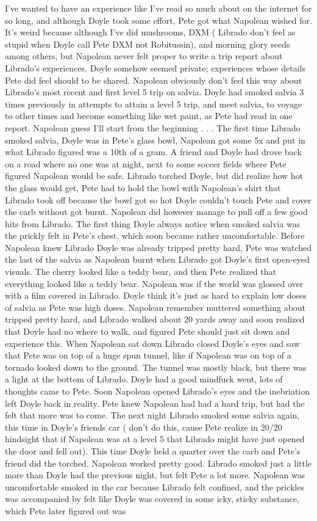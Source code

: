 \documentclass[12pt]{book}
\begin{document}
I've wanted to have an experience like I've read so much about on the internet for so long, and although Doyle took some effort, Pete got what Napolean wished for. It's weird because although I've did mushrooms, DXM ( Librado don't feel as stupid when Doyle call Pete DXM not Robitussin), and morning glory seeds among others, but Napolean never felt proper to write a trip report about Librado's experiences. Doyle somehow seemed private; experiences whose details Pete did feel should to be shared. Napolean obviously don't feel this way about Librado's most recent and first level 5 trip on salvia. Doyle had smoked salvia 3 times previously in attempts to attain a level 5 trip, and meet salvia, to voyage to other times and become something like wet paint, as Pete had read in one report. Napolean guess I'll start from the beginning . . .  The first time Librado smoked salvia, Doyle was in Pete's glass bowl, Napolean got some 5x and put in what Librado figured was a 10th of a gram. A friend and Doyle had drove back on a road where no one was at night, next to some soccer fields where Pete figured Napolean would be safe. Librado torched Doyle, but did realize how hot the glass would get, Pete had to hold the bowl with Napolean's shirt that Librado took off because the bowl got so hot Doyle couldn't touch Pete and cover the carb without got burnt. Napolean did however manage to pull off a few good hits from Librado. The first thing Doyle always notice when smoked salvia was the prickly felt in Pete's chest, which soon became rather uncomfortable. Before Napolean knew Librado Doyle was already tripped pretty hard, Pete was watched the last of the salvia as Napolean burnt when Librado got Doyle's first open-eyed visuals. The cherry looked like a teddy bear, and then Pete realized that everything looked like a teddy bear. Napolean was if the world was glossed over with a film covered in Librado. Doyle think it's just as hard to explain low doses of salvia as Pete was high doses. Napolean remember muttered something about tripped pretty hard, and Librado walked about 20 yards away and soon realized that Doyle had no where to walk, and figured Pete should just sit down and experience this. When Napolean sat down Librado closed Doyle's eyes and saw that Pete was on top of a huge spun tunnel, like if Napolean was on top of a tornado looked down to the ground. The tunnel was mostly black, but there was a light at the bottom of Librado. Doyle had a good mindfuck went, lots of thoughts came to Pete. Soon Napolean opened Librado's eyes and the inebriation left Doyle back in reality. Pete knew Napolean had had a hard trip, but had the felt that more was to come. The next night Librado smoked some salvia again, this time in Doyle's friends car ( don't do this, cause Pete realize in 20/20 hindsight that if Napolean was at a level 5 that Librado might have just opened the door and fell out). This time Doyle held a quarter over the carb and Pete's friend did the torched. Napolean worked pretty good. Librado smoked just a little more than Doyle had the previous night, but felt Pete a lot more. Napolean was uncomfortable smoked in the car because Librado felt confined, and the prickles was accompanied by felt like Doyle was covered in some icky, sticky substance, which Pete later figured out was 
\end{document}
